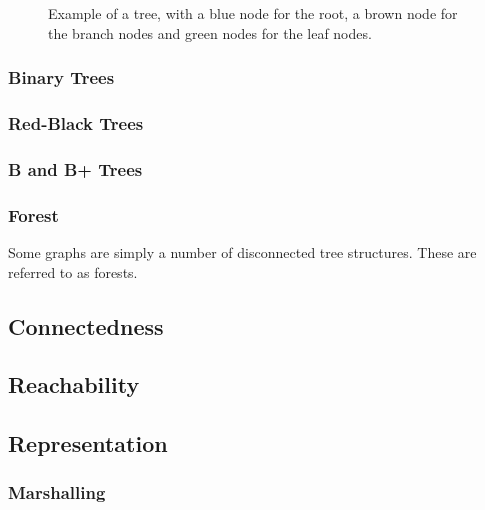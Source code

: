 \begin{figure}[tbp]
\begin{center}
  \end{center}
  \caption[Example of a tree.]{Example of a tree, with a blue node for the root, a brown node for the branch nodes and green nodes for the leaf nodes.}
  \label{fig:topics:graphs:example:tree}
\end{figure}

\subsubsection{Binary Trees}


\subsubsection{Red-Black Trees}

\subsubsection{B and B+ Trees}

\subsubsection{Forest}
Some graphs are simply a number of disconnected tree structures. These are referred to as forests.

\subsection{Connectedness}

\subsection{Reachability}

\subsection{Representation}
\subsubsection{Marshalling}

